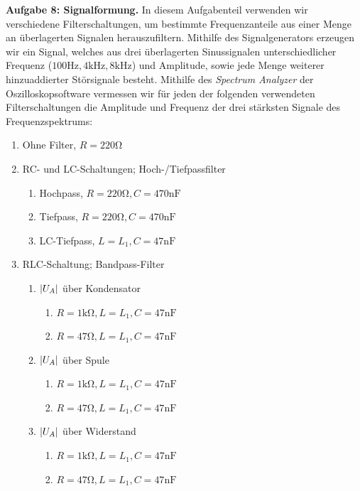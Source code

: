 \textbf{Aufgabe 8: Signalformung.} In diesem Aufgabenteil verwenden wir verschiedene Filterschaltungen, um bestimmte Frequenzanteile aus einer Menge an überlagerten Signalen herauszufiltern. Mithilfe des Signalgenerators erzeugen wir ein Signal, welches aus drei überlagerten Sinussignalen unterschiedlicher Frequenz ($100 \si{\hertz}, 4 \si{\kilo\hertz}, 8 \si{\kilo\hertz}$) und Amplitude, sowie jede Menge weiterer hinzuaddierter Störsignale besteht. Mithilfe des \textit{Spectrum Analyzer} der Oszilloskopsoftware vermessen wir für jeden der folgenden verwendeten Filterschaltungen die Amplitude und Frequenz der drei stärksten Signale des Frequenzspektrums:

\begin{multicols}{2}
  \begin{enumerate}[label=\arabic*.]
    \item Ohne Filter, $R = 220 \si{\ohm}$
    \item RC- und LC-Schaltungen; Hoch-/Tiefpassfilter
    \begin{enumerate}[label=\alph*)]
      \item Hochpass, $R = 220 \si{\ohm}, C = 470 \si{\nano\farad}$
      \item Tiefpass, $R = 220 \si{\ohm}, C = 470 \si{\nano\farad}$
      \item LC-Tiefpass, $L = L_1, C = 47 \si{\nano\farad}$
    \end{enumerate}
    \item RLC-Schaltung; Bandpass-Filter
    \begin{enumerate}[label=\alph*)]
      \item $\qty|U_A|$ über Kondensator
      \begin{enumerate}
        \item $R = 1 \si{\kilo\ohm}, L = L_1, C = 47 \si{\nano\farad}$
        \item $R = 47 \si{\ohm}, L = L_1, C = 47 \si{\nano\farad}$
      \end{enumerate}
      \item $\qty|U_A|$ über Spule
      \begin{enumerate}
        \item $R = 1 \si{\kilo\ohm}, L = L_1, C = 47 \si{\nano\farad}$
        \item $R = 47 \si{\ohm}, L = L_1, C = 47 \si{\nano\farad}$
      \end{enumerate}
      \item $\qty|U_A|$ über Widerstand
      \begin{enumerate}
        \item $R = 1 \si{\kilo\ohm}, L = L_1, C = 47 \si{\nano\farad}$
        \item $R = 47 \si{\ohm}, L = L_1, C = 47 \si{\nano\farad}$
      \end{enumerate}
    \end{enumerate}
  \end{enumerate}
  \vspace*{5em}
\end{multicols}

